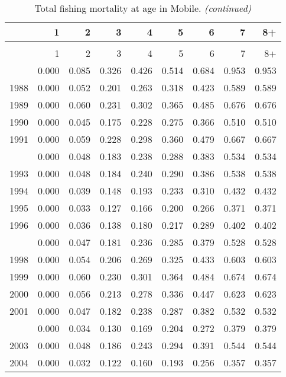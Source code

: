 \documentclass[
]{article}
\begin{document}
\begin{longtable}[t]{lrrrrrrrr}
\caption{\label{tab:Mobile-fleet-FAA-table}Total fishing mortality at age in Mobile.}\\
\toprule
  & 1 & 2 & 3 & 4 & 5 & 6 & 7 & 8+\\
\midrule
\endfirsthead
\caption[]{Total fishing mortality at age in Mobile. \textit{(continued)}}\\
\toprule
  & 1 & 2 & 3 & 4 & 5 & 6 & 7 & 8+\\
\midrule
\endhead

\endfoot
\bottomrule
\endlastfoot
1987 & 0.000 & 0.085 & 0.326 & 0.426 & 0.514 & 0.684 & 0.953 & 0.953\\
1988 & 0.000 & 0.052 & 0.201 & 0.263 & 0.318 & 0.423 & 0.589 & 0.589\\
1989 & 0.000 & 0.060 & 0.231 & 0.302 & 0.365 & 0.485 & 0.676 & 0.676\\
1990 & 0.000 & 0.045 & 0.175 & 0.228 & 0.275 & 0.366 & 0.510 & 0.510\\
1991 & 0.000 & 0.059 & 0.228 & 0.298 & 0.360 & 0.479 & 0.667 & 0.667\\
\addlinespace
1992 & 0.000 & 0.048 & 0.183 & 0.238 & 0.288 & 0.383 & 0.534 & 0.534\\
1993 & 0.000 & 0.048 & 0.184 & 0.240 & 0.290 & 0.386 & 0.538 & 0.538\\
1994 & 0.000 & 0.039 & 0.148 & 0.193 & 0.233 & 0.310 & 0.432 & 0.432\\
1995 & 0.000 & 0.033 & 0.127 & 0.166 & 0.200 & 0.266 & 0.371 & 0.371\\
1996 & 0.000 & 0.036 & 0.138 & 0.180 & 0.217 & 0.289 & 0.402 & 0.402\\
\addlinespace
1997 & 0.000 & 0.047 & 0.181 & 0.236 & 0.285 & 0.379 & 0.528 & 0.528\\
1998 & 0.000 & 0.054 & 0.206 & 0.269 & 0.325 & 0.433 & 0.603 & 0.603\\
1999 & 0.000 & 0.060 & 0.230 & 0.301 & 0.364 & 0.484 & 0.674 & 0.674\\
2000 & 0.000 & 0.056 & 0.213 & 0.278 & 0.336 & 0.447 & 0.623 & 0.623\\
2001 & 0.000 & 0.047 & 0.182 & 0.238 & 0.287 & 0.382 & 0.532 & 0.532\\
\addlinespace
2002 & 0.000 & 0.034 & 0.130 & 0.169 & 0.204 & 0.272 & 0.379 & 0.379\\
2003 & 0.000 & 0.048 & 0.186 & 0.243 & 0.294 & 0.391 & 0.544 & 0.544\\
2004 & 0.000 & 0.032 & 0.122 & 0.160 & 0.193 & 0.256 & 0.357 & 0.357\\

\end{longtable}
\end{document}
